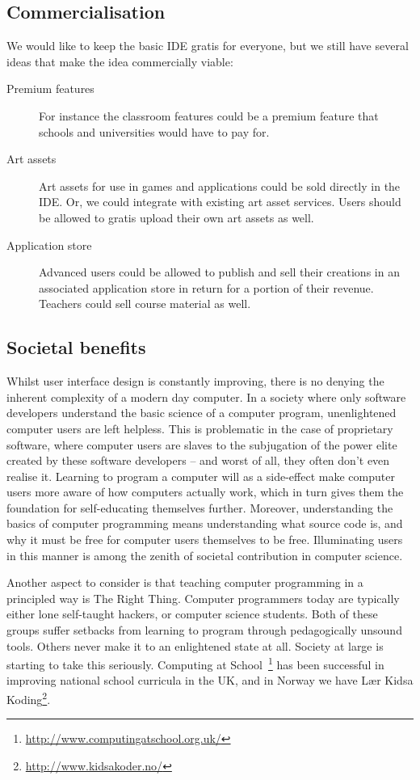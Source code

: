 \subsection{Commercialisation}

We would like to keep the basic IDE gratis for everyone, but we still have
several ideas that make the idea commercially viable:

\begin{description}
  \item[Premium features]
    For instance the classroom features could be a premium feature that schools
    and universities would have to pay for.
  \item[Art assets]
    Art assets for use in games and applications could be sold directly in the
    IDE. Or, we could integrate with existing art asset services. Users should 
    be allowed to gratis upload their own art assets as well.
  \item[Application store]
    Advanced users could be allowed to publish and sell their creations in an 
    associated application store in return for a portion of their revenue. 
    Teachers could sell course material as well.
\end{description}

\subsection{Societal benefits}
Whilst user interface design is constantly improving, there is no denying the 
inherent complexity of a modern day computer. In a society where only software 
developers understand the basic science of a computer program, unenlightened 
computer users are left helpless. This is problematic in the case of 
proprietary software, where computer users are slaves to the subjugation of 
the power elite created by these software developers -- and worst of all, they 
often don't even realise it. Learning to program a computer will as a 
side-effect make computer users more aware of how computers actually work, 
which in turn gives them the foundation for self-educating themselves further. 
Moreover, understanding the basics of computer programming means understanding 
what source code is, and why it must be free for computer users themselves to 
be free. Illuminating users in this manner is among the zenith of societal 
contribution in computer science.

Another aspect to consider is that teaching computer programming in a 
principled way is The Right Thing. Computer programmers today are typically 
either lone self-taught hackers, or computer science students. Both of these 
groups suffer setbacks from learning to program through pedagogically unsound 
tools. Others never make it to an enlightened state at all. Society at large 
is starting to take this seriously. Computing at 
School~\footnote{\url{http://www.computingatschool.org.uk/}} has been 
successful in improving national school curricula in the UK, and in Norway we 
have Lær Kidsa Koding\footnote{\url{http://www.kidsakoder.no/}}.

